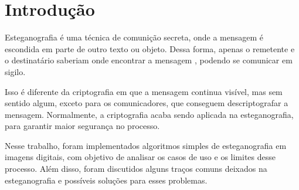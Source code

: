 \section{Introdução}

Esteganografia é uma técnica de comunição secreta, onde a mensagem é escondida em parte de outro texto ou objeto. Dessa forma, apenas o remetente e o destinatário saberiam onde encontrar a mensagem , podendo se comunicar em sigilo.


Isso é diferente da criptografia em que a mensagem continua visível, mas sem sentido algum, exceto para os comunicadores, que conseguem descriptografar a mensagem. Normalmente, a criptografia acaba sendo aplicada na esteganografia, para garantir maior segurança no processo.

Nesse trabalho, foram implementados algoritmos simples de esteganografia em imagens digitais, com objetivo de analisar os casos de uso e os limites desse processo. Além disso, foram discutidos alguns traços comuns deixados na esteganografia e possíveis soluções para esses problemas.
